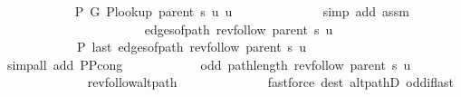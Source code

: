 \begin{isabellebody}
\ \ \ \ \ \ \ \ \ \ \isamarkupfalse%
\ {\isachardoublequoteopen}P{\isacharprime}{\kern0pt}\ G{}\ {\isacharparenleft}{\kern0pt}P{\isacharunderscore}{\kern0pt}lookup\ {\isacharparenleft}{\kern0pt}parent\ s{\isacharparenright}{\kern0pt}\ u{\isacharparenright}{\kern0pt}\ u{\isachardoublequoteclose}\isanewline
\ \ \ \ \ \ \ \ \ \ \ \ \isamarkupfalse%
\ {\isacharparenleft}{\kern0pt}simp\ add{\isacharcolon}{\kern0pt}\ assm{\isacharparenright}{\kern0pt}\isanewline
\ \ \ \ \ \ \ \ \ \ \isamarkupfalse%
\isanewline
\ \ \ \ \ \ \ \ \ \ \ \ {\isachardoublequoteopen}edges{\isacharunderscore}{\kern0pt}of{\isacharunderscore}{\kern0pt}path\ {\isacharparenleft}{\kern0pt}rev{\isacharunderscore}{\kern0pt}follow\ {\isacharparenleft}{\kern0pt}parent\ s{\isacharparenright}{\kern0pt}\ u{\isacharparenright}{\kern0pt}\ {\isasymnoteq}\ {\isacharbrackleft}{\kern0pt}{\isacharbrackright}{\kern0pt}{\isachardoublequoteclose}\isanewline
\ \ \ \ \ \ \ \ \ \ \ \ {\isachardoublequoteopen}P{\isacharprime}{\kern0pt}{\isacharprime}{\kern0pt}\ {\isacharparenleft}{\kern0pt}last\ {\isacharparenleft}{\kern0pt}edges{\isacharunderscore}{\kern0pt}of{\isacharunderscore}{\kern0pt}path\ {\isacharparenleft}{\kern0pt}rev{\isacharunderscore}{\kern0pt}follow\ {\isacharparenleft}{\kern0pt}parent\ s{\isacharparenright}{\kern0pt}\ u{\isacharparenright}{\kern0pt}{\isacharparenright}{\kern0pt}{\isacharparenright}{\kern0pt}{\isachardoublequoteclose}\isanewline
\ \ \ \ \ \ \ \ \ \ \ \ \isamarkupfalse%
\ {\isacharparenleft}{\kern0pt}simp{\isacharunderscore}{\kern0pt}all\ add{\isacharcolon}{\kern0pt}\ P{\isacharprime}{\kern0pt}{\isacharunderscore}{\kern0pt}P{\isacharprime}{\kern0pt}{\isacharprime}{\kern0pt}{\isacharunderscore}{\kern0pt}cong{\isacharparenright}{\kern0pt}\isanewline
\ \ \ \ \ \ \ \ \ \ \isamarkupfalse%
\ {\isachardoublequoteopen}odd\ {\isacharparenleft}{\kern0pt}path{\isacharunderscore}{\kern0pt}length\ {\isacharparenleft}{\kern0pt}rev{\isacharunderscore}{\kern0pt}follow\ {\isacharparenleft}{\kern0pt}parent\ s{\isacharparenright}{\kern0pt}\ u{\isacharparenright}{\kern0pt}{\isacharparenright}{\kern0pt}{\isachardoublequoteclose}\isanewline
\ \ \ \ \ \ \ \ \ \ \ \ \isamarkupfalse%
\ rev{\isacharunderscore}{\kern0pt}follow{\isacharunderscore}{\kern0pt}alt{\isacharunderscore}{\kern0pt}path\isanewline
\ \ \ \ \ \ \ \ \ \ \ \ \isamarkupfalse%
\ {\isacharparenleft}{\kern0pt}fastforce\ dest{\isacharcolon}{\kern0pt}\ alt{\isacharunderscore}{\kern0pt}pathD{\isacharparenleft}{\kern0pt}{}{\isacharparenright}{\kern0pt}\ odd{\isacharunderscore}{\kern0pt}if{\isacharunderscore}{\kern0pt}last{\isacharparenright}{\kern0pt}\isanewline

\end{isabellebody}
